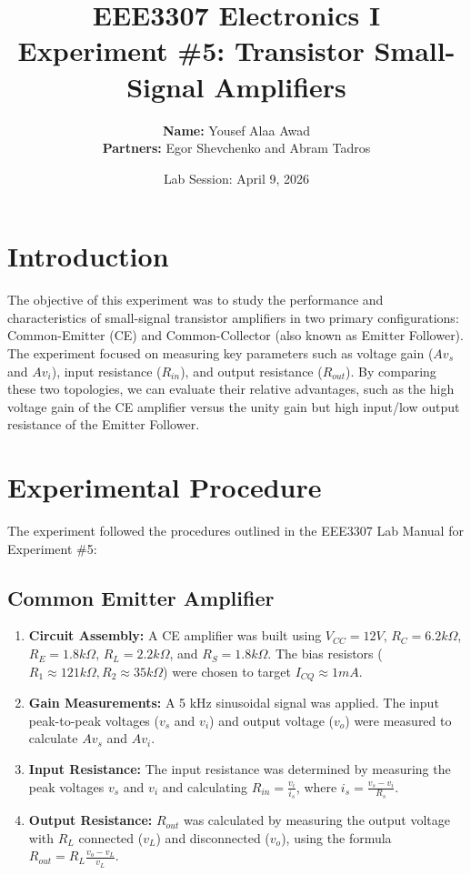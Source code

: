 \documentclass[12pt, letterpaper]{article}
\title{
    \vspace{1in}
    \textbf{\huge EEE3307 Electronics I} \\[0.5em]
    \textbf{\Large Experiment \#5: Transistor Small-Signal Amplifiers}
    \vspace{1.5in}
}
\author{
    \textbf{Name:} Yousef Alaa Awad \\
    \textbf{Partners:} Egor Shevchenko and Abram Tadros
}
\date{Lab Session: April 9, 2026}
\begin{document}
\maketitle
\newpage

\section{Introduction}
The objective of this experiment was to study the performance and characteristics of small-signal transistor amplifiers in two primary configurations: Common-Emitter (CE) and Common-Collector (also known as Emitter Follower). The experiment focused on measuring key parameters such as voltage gain ($Av_s$ and $Av_i$), input resistance ($R_{in}$), and output resistance ($R_{out}$). By comparing these two topologies, we can evaluate their relative advantages, such as the high voltage gain of the CE amplifier versus the unity gain but high input/low output resistance of the Emitter Follower.

\section{Experimental Procedure}
The experiment followed the procedures outlined in the EEE3307 Lab Manual for Experiment \#5:

\subsection{Common Emitter Amplifier}
\begin{enumerate}
    \item \textbf{Circuit Assembly:} A CE amplifier was built using $V_{CC}=12V$, $R_C=6.2k\Omega$, $R_E=1.8k\Omega$, $R_L=2.2k\Omega$, and $R_S=1.8k\Omega$. The bias resistors ($R_1 \approx 121k\Omega, R_2 \approx 35k\Omega$) were chosen to target $I_{CQ} \approx 1mA$.
    \item \textbf{Gain Measurements:} A 5 kHz sinusoidal signal was applied. The input peak-to-peak voltages ($v_s$ and $v_i$) and output voltage ($v_o$) were measured to calculate $Av_s$ and $Av_i$.
    \item \textbf{Input Resistance:} The input resistance was determined by measuring the peak voltages $v_s$ and $v_i$ and calculating $R_{in} = \frac{v_i}{i_s}$, where $i_s = \frac{v_s - v_i}{R_s}$.
    \item \textbf{Output Resistance:} $R_{out}$ was calculated by measuring the output voltage with $R_L$ connected ($v_L$) and disconnected ($v_o$), using the formula $R_{out} = R_L \frac{v_o - v_L}{v_L}$.
\end{enumerate}
\end{document}
